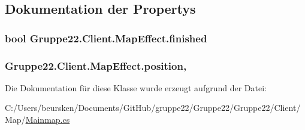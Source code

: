 \subsection{Dokumentation der Propertys}
\hypertarget{class_gruppe22_1_1_client_1_1_map_effect_acb43080240a1dd98c8d0d42cc10d835a}{
\subsubsection[{finished}]{\setlength{\rightskip}{0pt plus 5cm}bool Gruppe22.\-Client.\-Map\-Effect.\-finished\hspace{0.3cm}{\ttfamily [get]}}}\label{class_gruppe22_1_1_client_1_1_map_effect_acb43080240a1dd98c8d0d42cc10d835a}
\hypertarget{class_gruppe22_1_1_client_1_1_map_effect_a90edccf3148b277ee39d5a94f545ebba}{
\subsubsection[{position}]{ Gruppe22.\-Client.\-Map\-Effect.\-position\hspace{0.3cm}{\ttfamily [get]}, {\ttfamily [set]}}}\label{class_gruppe22_1_1_client_1_1_map_effect_a90edccf3148b277ee39d5a94f545ebba}


Die Dokumentation für diese Klasse wurde erzeugt aufgrund der Datei\-:\begin{DoxyCompactItemize}
\item 
C\-:/\-Users/beursken/\-Documents/\-Git\-Hub/gruppe22/\-Gruppe22/\-Gruppe22/\-Client/\-Map/\hyperlink{_mainmap_8cs}{Mainmap.\-cs}\end{DoxyCompactItemize}
